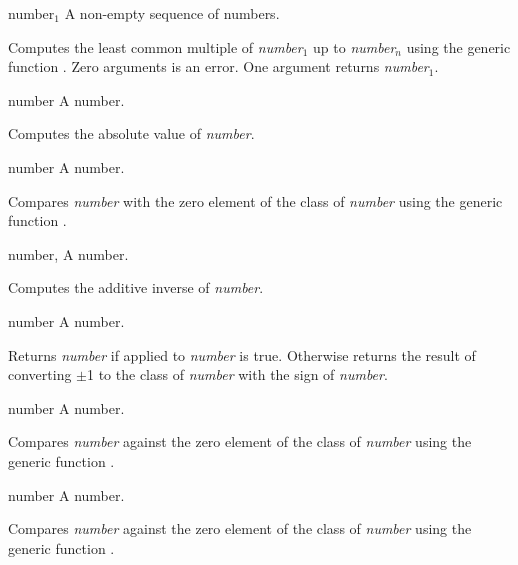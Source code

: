 \begin{optDefinition}
%
\begin{arguments}
    \item[{number$_1$ \optional{number$_2$ ...}}] A non-empty sequence of
    numbers.
\end{arguments}
%
\result%
Computes the least common multiple of {\em number$_1$} up to {\em number$_n$}
using the generic function .  Zero arguments is an error.  One
argument returns {\em number$_1$}.

%
\begin{arguments}
    \item[number] A number.
\end{arguments}
%
\result%
Computes the absolute value of {\em number}.

%
\begin{genericargs}
    \item[number] A number.
\end{genericargs}
%
\result%
Compares {\em number\/} with the zero element of the class of {\em number\/}
using the generic function .

%
\begin{genericargs}
    \item[number, \classref{number}] A number.
\end{genericargs}
%
\result%
Computes the additive inverse of {\em number}.

%
\begin{arguments}
    \item[number] A number.
\end{arguments}
%
\result%
Returns {\em number\/} if  applied to {\em number\/} is true.
Otherwise returns the result of converting $\pm$1 to the class of {\em number\/}
with the sign of {\em number}.

%
\begin{arguments}
    \item[number] A number.
\end{arguments}
%
\result%
Compares {\em number\/} against the zero element of the class of {\em number\/}
using the generic function .

%
\begin{arguments}
    \item[number] A number.
\end{arguments}
%
\result%
Compares {\em number\/} against the zero element of the class of {\em number\/}
using the generic function .


\end{optDefinition}

